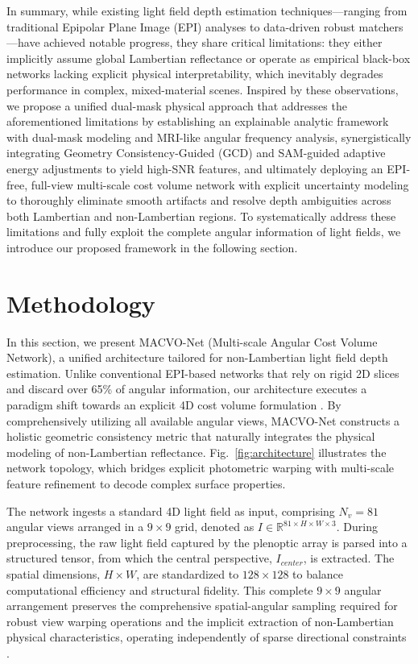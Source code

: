 \documentclass[lettersize,journal]{IEEEtran}
\begin{document}
In summary, while existing light field depth estimation techniques—ranging from traditional Epipolar Plane Image (EPI) analyses \cite{wanner2014, heber2018} to data-driven robust matchers \cite{li2021, zhang2023}—have achieved notable progress, they share critical limitations: they either implicitly assume global Lambertian reflectance or operate as empirical black-box networks lacking explicit physical interpretability, which inevitably degrades performance in complex, mixed-material scenes. Inspired by these observations, we propose a unified dual-mask physical approach that addresses the aforementioned limitations by establishing an explainable analytic framework with dual-mask modeling and MRI-like angular frequency analysis, synergistically integrating Geometry Consistency-Guided (GCD) and SAM-guided \cite{kirillov2023} adaptive energy adjustments to yield high-SNR features, and ultimately deploying an EPI-free, full-view multi-scale cost volume network with explicit uncertainty modeling to thoroughly eliminate smooth artifacts and resolve depth ambiguities across both Lambertian and non-Lambertian regions. To systematically address these limitations and fully exploit the complete angular information of light fields, we introduce our proposed framework in the following section.

\section{Methodology}

In this section, we present MACVO-Net (Multi-scale Angular Cost Volume Network), a unified architecture tailored for non-Lambertian light field depth estimation. Unlike conventional EPI-based networks that rely on rigid 2D slices and discard over 65\% of angular information, our architecture executes a paradigm shift towards an explicit 4D cost volume formulation \cite{heber2018}. By comprehensively utilizing all available angular views, MACVO-Net constructs a holistic geometric consistency metric that naturally integrates the physical modeling of non-Lambertian reflectance. Fig.~\ref{fig:architecture} illustrates the network topology, which bridges explicit photometric warping with multi-scale feature refinement to decode complex surface properties.

The network ingests a standard 4D light field as input, comprising $N_v = 81$ angular views arranged in a $9 \times 9$ grid, denoted as $I \in \mathbb{R}^{81 \times H \times W \times 3}$. During preprocessing, the raw light field captured by the plenoptic array is parsed into a structured tensor, from which the central perspective, $I_{center}$, is extracted. The spatial dimensions, $H \times W$, are standardized to $128 \times 128$ to balance computational efficiency and structural fidelity. This complete $9 \times 9$ angular arrangement preserves the comprehensive spatial-angular sampling required for robust view warping operations and the implicit extraction of non-Lambertian physical characteristics, operating independently of sparse directional constraints \cite{ng2005}.
\end{document}
